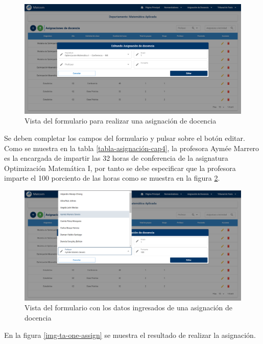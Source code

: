 \begin{figure}[H]
    \includegraphics[scale=0.3]{Graphics/Implementation/Docencia/AD-form-empty}
    \caption{Vista del formulario para realizar una asignación de docencia}
    \label{img-ta-form-empty}
\end{figure}


Se deben completar los campos del formulario y pulsar sobre el botón editar. 
Como se muestra en la tabla \ref{tabla-asignación-cap4}, la profesora Aymée Marrero es la encargada de 
impartir las 32 horas de conferencia de la asignatura Optimización Matemática I, por 
tanto se debe especificar que la profesora imparte el 100 porciento de las horas 
como se muestra en la figura \ref{img-ta-form-fill}.


\begin{figure}[H]
    \includegraphics[scale=0.3]{Graphics/Implementation/Docencia/AD-form-fill.png}
    \caption{Vista del formulario con los datos ingresados de una asignación de docencia}
    \label{img-ta-form-fill}
\end{figure}


En la figura \ref{img-ta-one-assign} se muestra el resultado 
de realizar la asignación.


